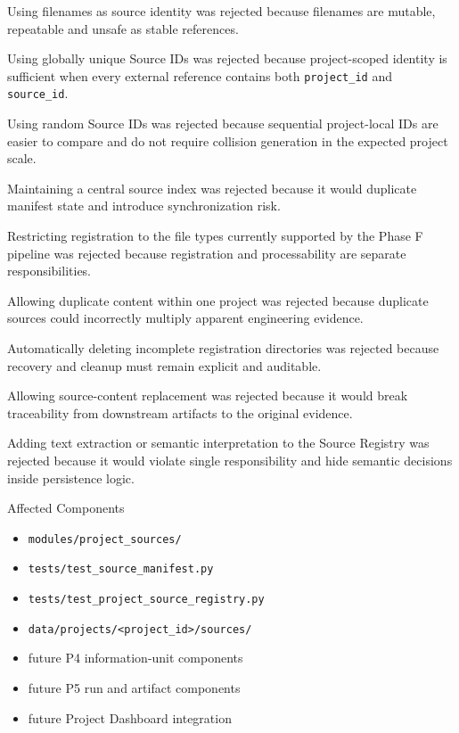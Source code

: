 Using filenames as source identity was rejected because filenames are mutable, repeatable and unsafe as stable references.

Using globally unique Source IDs was rejected because project-scoped identity is sufficient when every external reference contains both \texttt{project\_id} and \texttt{source\_id}.

Using random Source IDs was rejected because sequential project-local IDs are easier to compare and do not require collision generation in the expected project scale.

Maintaining a central source index was rejected because it would duplicate manifest state and introduce synchronization risk.

Restricting registration to the file types currently supported by the Phase F pipeline was rejected because registration and processability are separate responsibilities.

Allowing duplicate content within one project was rejected because duplicate sources could incorrectly multiply apparent engineering evidence.

Automatically deleting incomplete registration directories was rejected because recovery and cleanup must remain explicit and auditable.

Allowing source-content replacement was rejected because it would break traceability from downstream artifacts to the original evidence.

Adding text extraction or semantic interpretation to the Source Registry was rejected because it would violate single responsibility and hide semantic decisions inside persistence logic.

Affected Components

\begin{itemize}
\tightlist
\item
  \texttt{modules/project\_sources/}
\item
  \texttt{tests/test\_source\_manifest.py}
\item
  \texttt{tests/test\_project\_source\_registry.py}
\item
  \texttt{data/projects/\textless{}project\_id\textgreater{}/sources/}
\item
  future P4 information-unit components
\item
  future P5 run and artifact components
\item
  future Project Dashboard integration
\end{itemize}

